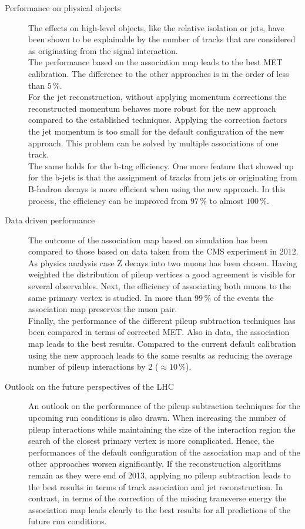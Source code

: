 \begin{description}
\item[Performance on physical objects] The effects on high-level objects, like the relative isolation or jets, have been shown to be explainable by the number of tracks that are considered as originating from the signal interaction. \\
The performance based on the association map leads to the best MET calibration. The difference to the other approaches is in the order of less than $5\,\%$. \\
For the jet reconstruction, without applying momentum corrections the reconstructed momentum behaves more robust for the new approach compared to the established techniques. Applying the correction factors the jet momentum is too small for the default configuration of the new approach. This problem can be solved by multiple associations of one track. \\
The same holds for the b-tag efficiency. One more feature that showed up for the b-jets is that the assignment of tracks from jets or originating from B-hadron decays is more efficient when using the new approach. In this process, the efficiency can be improved from $97\,\%$ to almost $100\,\%$.

\item[Data driven performance] The outcome of the association map based on simulation has been compared to those based on data taken from the CMS experiment in 2012. As physics analysis case Z decays into two muons has been chosen. Having weighted the distribution of pileup vertices a good agreement is visible for several observables. Next, the efficiency of associating both muons to the same primary vertex is studied. In more than $99\,\%$ of the events the association map preserves the muon pair. \\
Finally, the performance of the different pileup subtraction techniques has been compared in terms of corrected MET. Also in data, the association map leads to the best results. Compared to the current default calibration using the new approach leads to the same results as reducing the average number of pileup interactions by 2 ($\approx10\,\%$).

\item[Outlook on the future perspectives of the LHC] An outlook on the performance of the pileup subtraction techniques for the upcoming run conditions is also drawn. When increasing the number of pileup interactions while maintaining the size of the interaction region the search of the closest primary vertex is more complicated. Hence, the performances of the default configuration of the association map and of the other approaches worsen significantly. If the reconstruction algorithms remain as they were end of 2013, applying no pileup subtraction leads to the best results in terms of track association and jet reconstruction. In contrast, in terms of the correction of the missing transverse energy the association map leads clearly to the best results for all predictions of the future run conditions.

\end{description}


